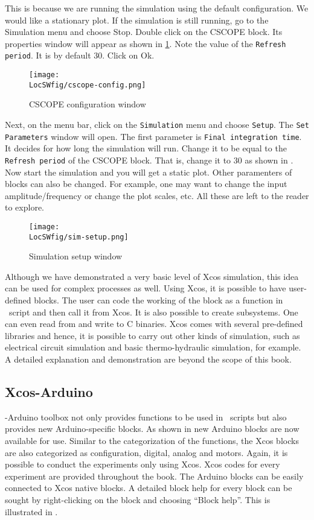 This is because we are running the simulation using the default
configuration.  We would like a stationary plot.  If the simulation is
still running, go to the Simulation menu and choose Stop.  Double
click on the CSCOPE block. Its properties window will appear as shown
in \ref{cscope-config}. Note the value of the {\tt Refresh period}. It
is by default 30. Click on Ok.

\begin{figure}
      \centering
      \texttt{[image: \\LocSWfig/cscope-config.png]}
      \caption{CSCOPE configuration window}
      \label{cscope-config}
\end{figure}

Next, on the menu bar, click on the {\tt Simulation} menu and choose
      {\tt Setup}. The {\tt Set Parameters} window will open. The first
parameter is {\tt Final integration time}. It decides for how long the
simulation will run. Change it to be equal to the {\tt Refresh period}
of the CSCOPE block.  That is, change it to 30 as shown in
. Now start the simulation and you will get a static
plot.  Other paramenters of blocks can also be changed. For example,
one may want to change the input amplitude/frequency or change the
plot scales, etc. All these are left to the reader to explore.

\begin{figure}
      \centering
      \texttt{[image: \\LocSWfig/sim-setup.png]}
      \caption{Simulation setup window}
      \label{sim-setup}
\end{figure}

Although we have demonstrated a very basic level of Xcos simulation,
this idea can be used for complex processes as well.  Using Xcos, it
is possible to have user-defined blocks. The user can code the
working of the block as a function in \scilab\ script and then call it
from Xcos.  It is also possible to create subsystems.  
One can even read from and write to C binaries.  Xcos comes with
several pre-defined libraries and hence, it is possible to carry out
other kinds of simulation, such as electrical circuit simulation and
basic thermo-hydraulic simulation, for example.  A detailed 
explanation and demonstration are beyond the scope of this book.


\subsection{Xcos-Arduino}
\scilab-Arduino toolbox not only provides functions to be used in
\scilab\ scripts but also provides new Arduino-specific blocks. As
shown in  new Arduino blocks are now available
for use.  Similar to the categorization of the functions, the Xcos
blocks are also categorized as configuration, digital, analog and
motors. Again, it is possible to conduct the experiments only using
Xcos. Xcos codes for every experiment are provided throughout the
book. The Arduino blocks can be easily connected to Xcos native
blocks. A detailed block help for every block can be sought by right-clicking on the block and choosing ``Block help''. This is illustrated
in .

